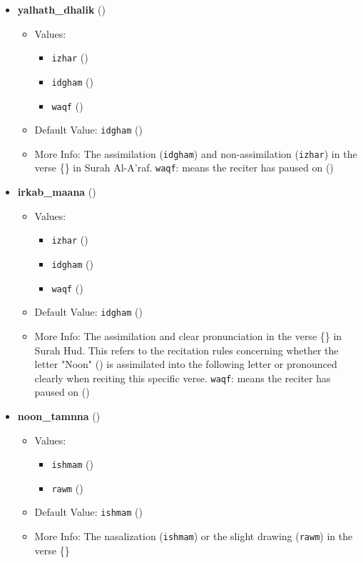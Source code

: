 \begin{itemize}
\item \textbf{yalhath\_dhalik} ()
  \begin{itemize}
  \item Values: 
    \begin{itemize}
    \item  \texttt{izhar} ()
    \item  \texttt{idgham} ()
    \item  \texttt{waqf} ()
    \end{itemize}
  \item Default Value: \texttt{idgham} ()
  \item More Info: The assimilation (\texttt{idgham}) and non-assimilation (\texttt{izhar}) in the verse \{\} in Surah Al-A'raf. \texttt{waqf}: means the reciter has paused on ()
  \end{itemize}

\item \textbf{irkab\_maana} ()
  \begin{itemize}
  \item Values: 
    \begin{itemize}
    \item  \texttt{izhar} ()
    \item  \texttt{idgham} ()
    \item  \texttt{waqf} ()
    \end{itemize}
  \item Default Value: \texttt{idgham} ()
  \item More Info: The assimilation and clear pronunciation in the verse \{\} in Surah Hud. This refers to the recitation rules concerning whether the letter "Noon" () is assimilated into the following letter or pronounced clearly when reciting this specific verse. \texttt{waqf}: means the reciter has paused on ()
  \end{itemize}

\item \textbf{noon\_tamnna} ()
  \begin{itemize}
  \item Values: 
    \begin{itemize}
    \item  \texttt{ishmam} ()
    \item  \texttt{rawm} ()
    \end{itemize}
  \item Default Value: \texttt{ishmam} ()
  \item More Info: The nasalization (\texttt{ishmam}) or the slight drawing (\texttt{rawm}) in the verse \{\}
  \end{itemize}


\end{itemize}
